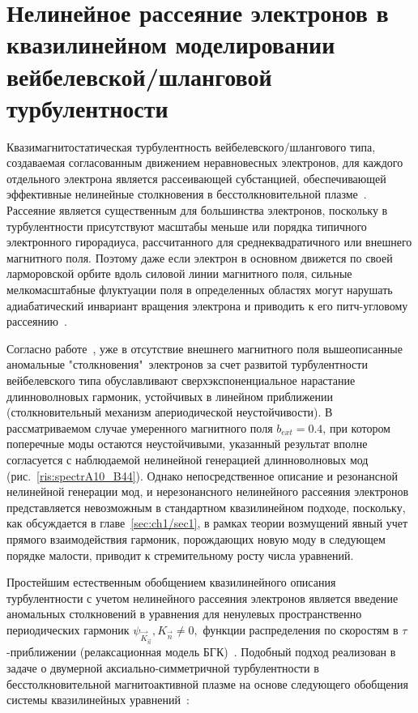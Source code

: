 \section{Нелинейное рассеяние электронов в квазилинейном моделировании вейбелевской/шланговой турбулентности}
\label{ch:ch4/sec10} 


Квазимагнитостатическая турбулентность вейбелевского/шлангового типа, создаваемая согласованным движением неравновесных электронов, для каждого отдельного электрона является рассеивающей субстанцией, обеспечивающей эффективные нелинейные столкновения в бесстолкновительной плазме~\cite{Fleishman2013,Medvedev2017}. Рассеяние является существенным для большинства электронов, поскольку в турбулентности присутствуют масштабы меньше или порядка типичного электронного гирорадиуса, рассчитанного для среднеквадратичного или внешнего магнитного поля. Поэтому даже если электрон в основном движется по своей ларморовской орбите вдоль силовой линии магнитного поля, сильные мелкомасштабные флуктуации поля в определенных областях могут нарушать адиабатический инвариант вращения электрона и приводить к его питч-угловому рассеянию~\cite{Fleishman2013,Medvedev2017,Keenan2013,Keenan2015,Emelyanov2025,Deutsch2005}. 

Согласно работе~\cite{Emelyanov2025}, уже в отсутствие внешнего магнитного поля вышеописанные аномальные "столкновения"\ электронов за счет развитой турбулентности вейбелевского типа обуславливают сверхэкспоненциальное нарастание длинноволновых гармоник, устойчивых в линейном приближении (столкновительный механизм апериодической неустойчивости).
В рассматриваемом случае умеренного магнитного поля $b_{ext}=0.4$, при котором поперечные моды остаются неустойчивыми, указанный результат вполне согласуется с наблюдаемой нелинейной генерацией длинноволновых мод  (рис.~\ref{ris:spectrA10_B44}). Однако непосредственное описание и резонансной нелинейной генерации мод, и нерезонансного нелинейного рассеяния электронов представляется невозможным в стандартном квазилинейном подходе, поскольку, как обсуждается в главе~\ref{sec:ch1/sec1}, в рамках теории возмущений явный учет прямого взаимодействия гармоник, порождающих новую моду в следующем порядке малости, приводит к стремительному росту числа уравнений.

Простейшим естественным обобщением квазилинейного описания турбулентности с учетом нелинейного рассеяния электронов является введение аномальных столкновений в уравнения для ненулевых пространственно периодических гармоник $\psi_{\vec{K}_{\vec{n}}}, K_{\vec{n}}\neq0,$ функции распределения по скоростям %
в $\tau$-приближении (релаксационная модель БГК)~\cite{Bhatnagar1954,Medvedev2017}. Подобный подход реализован в задаче о двумерной аксиально-симметричной турбулентности в бесстолкновительной магнитоактивной плазме на основе следующего обобщения системы квазилинейных уравнений~\cite{Kuznetsov2023}:

